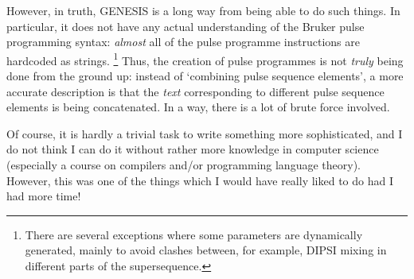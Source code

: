 However, in truth, GENESIS is a long way from being able to do such things.
In particular, it does not have any actual understanding of the Bruker pulse programming syntax: \textit{almost} all of the pulse programme instructions are hardcoded as strings.%
\footnote{There are several exceptions where some parameters are dynamically generated, mainly to avoid clashes between, for example, DIPSI mixing in different parts of the supersequence.}
Thus, the creation of pulse programmes is not \textit{truly} being done from the ground up: instead of `combining pulse sequence elements', a more accurate description is that the \textit{text} corresponding to different pulse sequence elements is being concatenated.
In a way, there is a lot of brute force involved.

Of course, it is hardly a trivial task to write something more sophisticated, and I do not think I can do it without rather more knowledge in computer science (especially a course on compilers and/or programming language theory).
However, this was one of the things which I would have really liked to do had I had more time!
